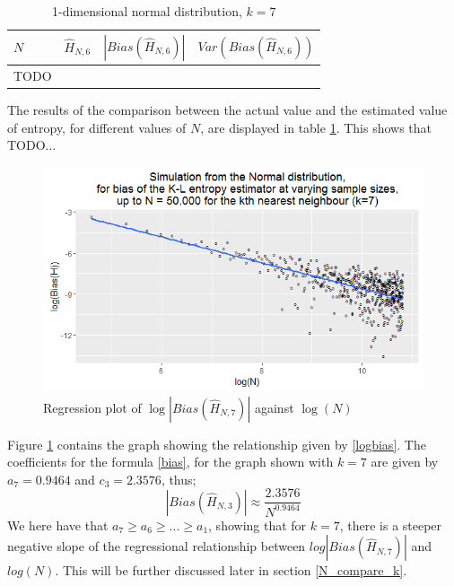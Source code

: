 \documentclass{report}
\begin{document}
\begin{table}
\caption{1-dimensional normal distribution, $k=7$} \label{normal_k=7_table}
\begin{center}
\begin{tabular}{| l | c c c|} 
\toprule
$N$ & $\hat{H}_{N, 6}$ & $|Bias(\hat{H}_{N, 6})|$ & $Var(Bias(\hat{H}_{N, 6}))$ \\
\midrule[1pt]
TODO & & & \\
\hline
\end{tabular}
\end{center}
\end{table}

The results of the comparison between the actual value and the estimated value of entropy, for different values of $N$, are displayed in table \ref{normal_k=7_table}. This shows that TODO...

\begin{figure}
  \begin{center}
    \includegraphics[width=\textwidth]{./Graphs/new_normal_k=7.png}
  \end{center}
\caption{Regression plot of $\log|Bias(\hat{H}_{N, 7})|$ against $\log(N)$}
  \label{normal_k=7_graph}
\end{figure}

Figure \ref{normal_k=7_graph} contains the graph showing the relationship given by \ref{logbias}. The coefficients for the formula \ref{bias}, for the graph shown with $k=7$ are given by $a_{7} = 0.9464$ and $c_{3} = 2.3576$, thus;
\begin{equation}
|Bias(\hat{H}_{N, 3})| \approx \frac{2.3576}{N^{0.9464}} \nonumber
\end{equation}
We here have that $a_{7} \geq a_{6} \geq ... \geq a_{1}$, showing that for $k=7$, there is a steeper negative slope of the regressional relationship between $log|Bias(\hat{H}_{N,7})|$ and $log(N)$. This will be further discussed later in section \ref{N_compare_k}.
\end{document}
